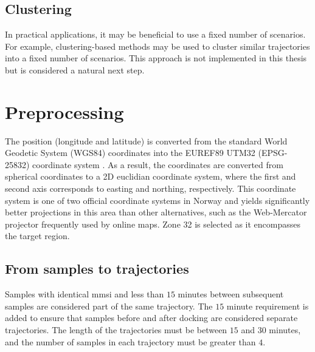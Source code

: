\subsection{Clustering}
In practical applications, it may be beneficial to use a fixed number of scenarios. For example, clustering-based methods may be used to cluster similar trajectories into a fixed number of scenarios. This approach is not implemented in this thesis but is considered a natural next step.


\section{Preprocessing}
The position (longitude and latitude) is converted from the standard World Geodetic System (WGS84) coordinates into the EUREF89 UTM32 (EPSG-25832) coordinate system \cite{kartverket}.  As a result, the coordinates are converted from spherical coordinates to a 2D euclidian coordinate system, where the first and second axis corresponds to easting and northing, respectively. This coordinate system is one of two official coordinate systems in Norway and yields significantly better projections in this area than other alternatives, such as the Web-Mercator projector frequently used by online maps. Zone 32 is selected as it encompasses the target region.

\subsection{From samples to trajectories}\label{sec:from_ais_to_traj}
Samples with identical \acrshort{mmsi} and less than $15$ minutes between subsequent samples are considered part of the same trajectory. The $15$ minute requirement is added to ensure that samples before and after docking are considered separate trajectories. The length of the trajectories must be between $15$ and $30$ minutes, and the number of samples in each trajectory must be greater than $4$. 
